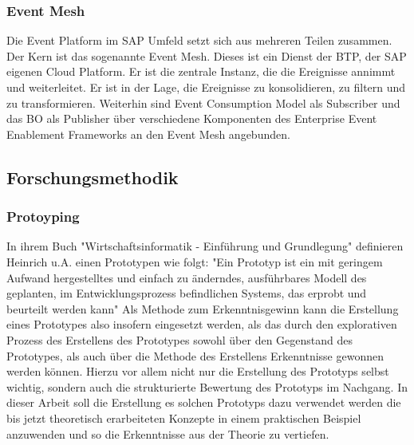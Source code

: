 \subsubsection*{Event Mesh}
Die Event Platform im  SAP Umfeld setzt sich aus mehreren Teilen zusammen. Der Kern ist das sogenannte Event Mesh. Dieses ist ein Dienst der \ac{BTP}, der SAP eigenen Cloud Platform. Er ist die zentrale Instanz, die die Ereignisse annimmt und weiterleitet. Er ist in der Lage, die Ereignisse zu konsolidieren, zu filtern und zu transformieren. \citepls Weiterhin sind Event Consumption Model als Subscriber und das \ac{BO} als Publisher über verschiedene Komponenten des Enterprise Event Enablement Frameworks an den Event Mesh angebunden. \citepls

\subsection{Forschungsmethodik}
\subsubsection*{Protoyping}
\label{Protoyping}
In ihrem Buch "Wirtschaftsinformatik - Einführung und Grundlegung" definieren Heinrich u.A. einen Prototypen wie folgt: "Ein Prototyp ist ein mit geringem Aufwand hergestelltes und einfach zu änderndes, ausführbares Modell des geplanten, im Entwicklungsprozess befindlichen Systems, das erprobt und beurteilt werden kann"\cite[S. 114]{heinrich2007wirtschaftsinformatik}
Als Methode zum Erkenntnisgewinn kann die Erstellung eines Prototypes also insofern eingesetzt werden, als das durch den explorativen Prozess des Erstellens des Prototypes sowohl über den Gegenstand des Prototypes, als auch über die Methode des Erstellens Erkenntnisse gewonnen werden können. Hierzu vor allem nicht nur die Erstellung des Prototyps selbst wichtig, sondern auch die strukturierte Bewertung des Prototyps im Nachgang.\cite[S. 119]{heinrich2007wirtschaftsinformatik} In dieser Arbeit soll die Erstellung es solchen Prototyps dazu verwendet werden die bis jetzt theoretisch erarbeiteten Konzepte in einem praktischen Beispiel anzuwenden und so die Erkenntnisse aus der Theorie zu vertiefen.


